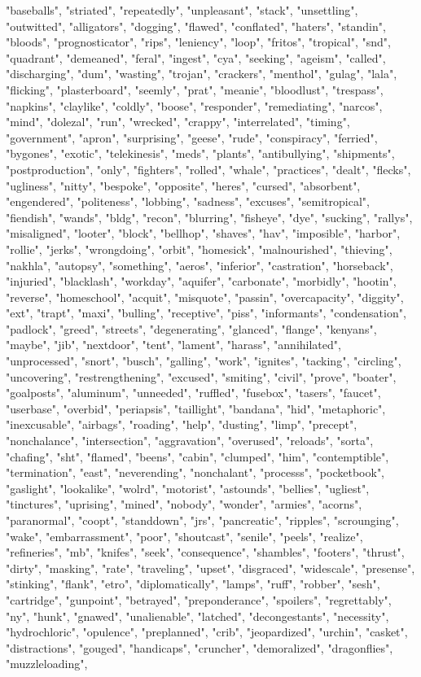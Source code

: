 "baseballs", "striated", "repeatedly", "unpleasant", "stack", "unsettling", "outwitted", "alligators", "dogging", "flawed", "conflated", "haters", "standin", "bloods", "prognosticator", "rips", "leniency", "loop", "fritos", "tropical", "snd", "quadrant", "demeaned", "feral", "ingest", "cya", "seeking", "ageism", "called", "discharging", "dum", "wasting", "trojan", "crackers", "menthol", "gulag", "lala", "flicking", "plasterboard", "seemly", "prat", "meanie", "bloodlust", "trespass", "napkins", "claylike", "coldly", "boose", "responder", "remediating", "narcos", "mind", "dolezal", "run", "wrecked", "crappy", "interrelated", "timing", "government", "apron", "surprising", "geese", "rude", "conspiracy", "ferried", "bygones", "exotic", "telekinesis", "meds", "plants", "antibullying", "shipments", "postproduction", "only", "fighters", "rolled", "whale", "practices", "dealt", "flecks", "ugliness", "nitty", "bespoke", "opposite", "heres", "cursed", "absorbent", "engendered", "politeness", "lobbing", "sadness", "excuses", "semitropical", "fiendish", "wands", "bldg", "recon", "blurring", "fisheye", "dye", "sucking", "rallys", "misaligned", "looter", "block", "bellhop", "shaves", "hav", "imposible", "harbor", "rollie", "jerks", "wrongdoing", "orbit", "homesick", "malnourished", "thieving", "nakhla", "autopsy", "something", "aeros", "inferior", "castration", "horseback", "injuried", "blacklash", "workday", "aquifer", "carbonate", "morbidly", "hootin", "reverse", "homeschool", "acquit", "misquote", "passin", "overcapacity", "diggity", "ext", "trapt", "maxi", "bulling", "receptive", "piss", "informants", "condensation", "padlock", "greed", "streets", "degenerating", "glanced", "flange", "kenyans", "maybe", "jib", "nextdoor", "tent", "lament", "harass", "annihilated", "unprocessed", "snort", "busch", "galling", "work", "ignites", "tacking", "circling", "uncovering", "restrengthening", "excused", "smiting", "civil", "prove", "boater", "goalposts", "aluminum", "unneeded", "ruffled", "fusebox", "tasers", "faucet", "userbase", "overbid", "periapsis", "taillight", "bandana", "hid", "metaphoric", "inexcusable", "airbags", "roading", "help", "dusting", "limp", "precept", "nonchalance", "intersection", "aggravation", "overused", "reloads", "sorta", "chafing", "sht", "flamed", "beens", "cabin", "clumped", "him", "contemptible", "termination", "east", "neverending", "nonchalant", "processs", "pocketbook", "gaslight", "lookalike", "wolrd", "motorist", "astounds", "bellies", "ugliest", "tinctures", "uprising", "mined", "nobody", "wonder", "armies", "acorns", "paranormal", "coopt", "standdown", "jrs", "pancreatic", "ripples", "scrounging", "wake", "embarrassment", "poor", "shoutcast", "senile", "peels", "realize", "refineries", "mb", "knifes", "seek", "consequence", "shambles", "footers", "thrust", "dirty", "masking", "rate", "traveling", "upset", "disgraced", "widescale", "presense", "stinking", "flank", "etro", "diplomatically", "lamps", "ruff", "robber", "sesh", "cartridge", "gunpoint", "betrayed", "preponderance", "spoilers", "regrettably", "ny", "hunk", "gnawed", "unalienable", "latched", "decongestants", "necessity", "hydrochloric", "opulence", "preplanned", "crib", "jeopardized", "urchin", "casket", "distractions", "gouged", "handicaps", "cruncher", "demoralized", "dragonflies", "muzzleloading", 